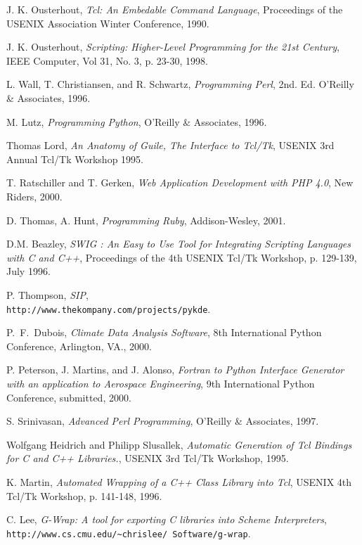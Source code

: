 \begin{thebibliography}{99}


 J. K. Ousterhout, {\em Tcl: An Embedable Command Language},
Proceedings of the USENIX Association Winter Conference, 1990.

 J. K. Ousterhout, {\em Scripting: Higher-Level Programming for the 21st Century},
IEEE Computer, Vol 31, No. 3, p. 23-30, 1998.

 L. Wall, T. Christiansen, and R. Schwartz, {\em Programming Perl}, 2nd. Ed.
O'Reilly \& Associates, 1996.

 M. Lutz, {\em Programming Python}, O'Reilly \& Associates, 1996.

 Thomas Lord, {\em An Anatomy of Guile, The Interface to 
Tcl/Tk}, USENIX 3rd Annual Tcl/Tk Workshop 1995.

 T. Ratschiller and T. Gerken, {\em Web Application Development with PHP 4.0},
New Riders, 2000.

 D. Thomas, A. Hunt, {\em Programming Ruby}, Addison-Wesley, 2001.

 D.M. Beazley, {\em SWIG : An Easy to Use Tool for Integrating Scripting Languages with C and C++}, Proceedings of the 4th USENIX Tcl/Tk Workshop, p. 129-139, July 1996. 

 P. Thompson, {\em SIP},\\
{\tt http://www.thekompany.com/projects/pykde}.

 P.~F.~Dubois, {\em Climate Data Analysis Software}, 8th International Python Conference,
Arlington, VA., 2000.

 P. Peterson, J. Martins, and J. Alonso,
{\em Fortran to Python Interface Generator with an application to Aerospace
Engineering}, 9th International Python Conference, submitted, 2000.

 S. Srinivasan, {\em Advanced Perl Programming}, O'Reilly \& Associates, 1997.

 Wolfgang Heidrich and Philipp Slusallek, {\em Automatic Generation of Tcl Bindings for C and C++ Libraries.},
USENIX 3rd Tcl/Tk Workshop, 1995.

 K. Martin, {\em Automated Wrapping of a C++ Class Library into Tcl},
USENIX 4th Tcl/Tk Workshop, p. 141-148, 1996. 

 C. Lee, {\em G-Wrap: A tool for exporting C libraries into Scheme Interpreters},\\
{\tt http://www.cs.cmu.edu/\~{ }chrislee/
Software/g-wrap}.


\end{thebibliography}
